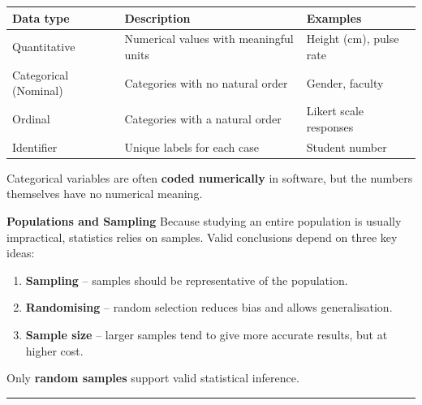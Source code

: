 \documentclass[
  11pt,
  oneside]{scrbook}
\newcounter{none} %
\begin{document}
{\def\LTcaptype{none} %
\begin{longtable}[]{@{}
  >{\raggedright\arraybackslash}p{}
  >{\raggedright\arraybackslash}p{}
  >{\raggedright\arraybackslash}p{}@{}}
\toprule\noalign{}
\begin{minipage}[b]{\linewidth}\raggedright
Data type
\end{minipage} & \begin{minipage}[b]{\linewidth}\raggedright
Description
\end{minipage} & \begin{minipage}[b]{\linewidth}\raggedright
Examples
\end{minipage} \\
\midrule\noalign{}
\endhead
\bottomrule\noalign{}
\endlastfoot
Quantitative & Numerical values with meaningful units & Height (cm), pulse rate \\
Categorical (Nominal) & Categories with no natural order & Gender, faculty \\
Ordinal & Categories with a natural order & Likert scale responses \\
Identifier & Unique labels for each case & Student number \\
\end{longtable}
}

Categorical variables are often \textbf{coded numerically} in software, but the numbers themselves have no numerical meaning.

\textbf{Populations and Sampling}
Because studying an entire population is usually impractical, statistics relies on samples. Valid conclusions depend on three key ideas:

\begin{enumerate}
\def\labelenumi{\arabic{enumi}.}
\item
  \textbf{Sampling} -- samples should be representative of the population.
\item
  \textbf{Randomising} -- random selection reduces bias and allows generalisation.
\item
  \textbf{Sample size} -- larger samples tend to give more accurate results, but at higher cost.
\end{enumerate}

Only \textbf{random samples} support valid statistical inference.

\begin{center}\rule{0.5\linewidth}{0.5pt}\end{center}
\end{document}
